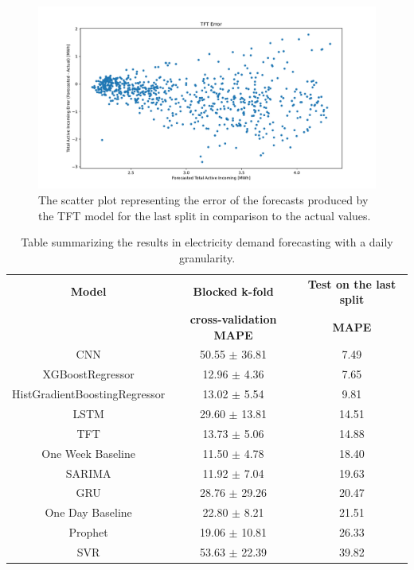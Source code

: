 \begin{figure}[H]
\centering
\includegraphics[width=1\textwidth]{images/demand/TFT_error_scatter_plot_predicted}
\caption{The scatter plot representing the error of the forecasts produced by the TFT model for the last split in comparison to the actual values.}
\label{fig:demandtfthourlyforecastsscatterplot}
\end{figure}

\begin{table}[H]
\centering
\begin{tabular}{|c|c|c|}
\hline
\textbf{Model} & \textbf{Blocked k-fold} & \textbf{Test on the last split}\\
 & \textbf{cross-validation MAPE} & \textbf{MAPE}\\
\hline
CNN & 50.55 $\pm$ 36.81 & 7.49\\
\hline
XGBoostRegressor & 12.96 $\pm$ 4.36 & 7.65\\
\hline
HistGradientBoostingRegressor & 13.02 $\pm$ 5.54 & 9.81\\
\hline
LSTM & 29.60 $\pm$ 13.81 & 14.51\\
\hline
TFT & 13.73 $\pm$ 5.06 & 14.88\\
\hline
One Week Baseline & 11.50 $\pm$ 4.78 & 18.40\\
\hline
SARIMA & 11.92 $\pm$ 7.04 & 19.63\\
\hline
GRU & 28.76 $\pm$ 29.26 & 20.47\\
\hline
One Day Baseline & 22.80 $\pm$ 8.21 & 21.51\\
\hline
Prophet & 19.06 $\pm$ 10.81 & 26.33\\
\hline
SVR & 53.63 $\pm$ 22.39 & 39.82\\
\hline
\end{tabular}
\caption{Table summarizing the results in electricity demand forecasting with a daily granularity.}
\label{tab:demanddailyresults}
\end{table}

